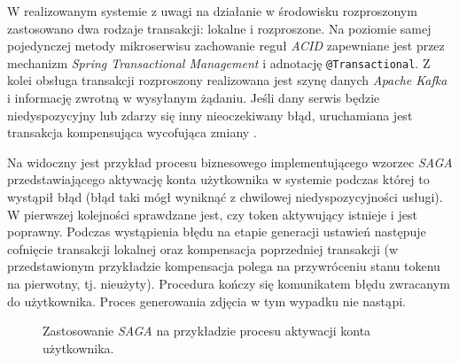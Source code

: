 W realizowanym systemie z uwagi na działanie w środowisku rozproszonym zastosowano dwa rodzaje transakcji: lokalne i
rozproszone. Na poziomie samej pojedynczej metody mikroserwisu zachowanie reguł \textit{ACID} zapewniane jest przez
mechanizm \textit{Spring Transactional Management} i adnotację \verb|@Transactional|. Z kolei obsługa transakcji
rozproszony realizowana jest szynę danych \textit{Apache Kafka} i informację zwrotną w wysyłanym żądaniu. Jeśli dany
serwis będzie niedyspozycyjny lub zdarzy się inny nieoczekiwany błąd, uruchamiana jest transakcja kompensująca
wycofująca zmiany \cite{bib:saga}.

Na  widoczny jest przykład procesu biznesowego implementującego wzorzec \textit{SAGA}
przedstawiającego aktywację konta użytkownika w systemie podczas której to wystąpił błąd (błąd taki mógł wyniknąć z
chwilowej niedyspozycyjności usługi). W pierwszej kolejności sprawdzane jest, czy token aktywujący istnieje i jest
poprawny. Podczas wystąpienia błędu na etapie generacji ustawień następuje cofnięcie transakcji lokalnej oraz
kompensacja poprzedniej transakcji (w przedstawionym przykładzie kompensacja polega na przywróceniu stanu tokenu na
pierwotny, tj. nieużyty). Procedura kończy się komunikatem błędu zwracanym do użytkownika. Proces generowania zdjęcia w
tym wypadku nie nastąpi.
%
\begin{figure}[H]
  \centering
  \caption{Zastosowanie \textit{SAGA} na przykładzie procesu aktywacji konta użytkownika.}
  \label{fig:saga-pattern}
\end{figure}
